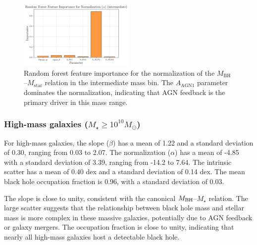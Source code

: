 \documentclass[twocolumn]{aastex631}
\begin{document}
\begin{figure}[ht!]
    \centering
    \includegraphics[width=0.5\textwidth]{../Project5/plots/featimp_RandomForest_Normalization_alpha_intermediate_72_20250423_182559.png}
    \caption{Random forest feature importance for the normalization of the $M_\mathrm{BH}$–$M_\mathrm{star}$ relation in the intermediate mass bin. The $A_\mathrm{AGN1}$ parameter dominates the normalization, indicating that AGN feedback is the primary driver in this mass range.
}
    \label{fig:featimp_norm_random_intermediate}
\end{figure}

\subsubsection{High-mass galaxies ($M_{\star} \geq 10^{10} M_{\odot}$)}

For high-mass galaxies, the slope ($\beta$) has a mean of 1.22 and a standard deviation of 0.30, ranging from 0.03 to 2.07. The normalization ($\alpha$) has a mean of -4.85 with a standard deviation of 3.39, ranging from -14.2 to 7.64. The intrinsic scatter has a mean of 0.40 dex and a standard deviation of 0.14 dex. The mean black hole occupation fraction is 0.96, with a standard deviation of 0.03.

The slope is close to unity, consistent with the canonical $M_{\rm BH}$--$M_{\star}$ relation. The large scatter suggests that the relationship between black hole mass and stellar mass is more complex in these massive galaxies, potentially due to AGN feedback or galaxy mergers. The occupation fraction is close to unity, indicating that nearly all high-mass galaxies host a detectable black hole.
\end{document}

